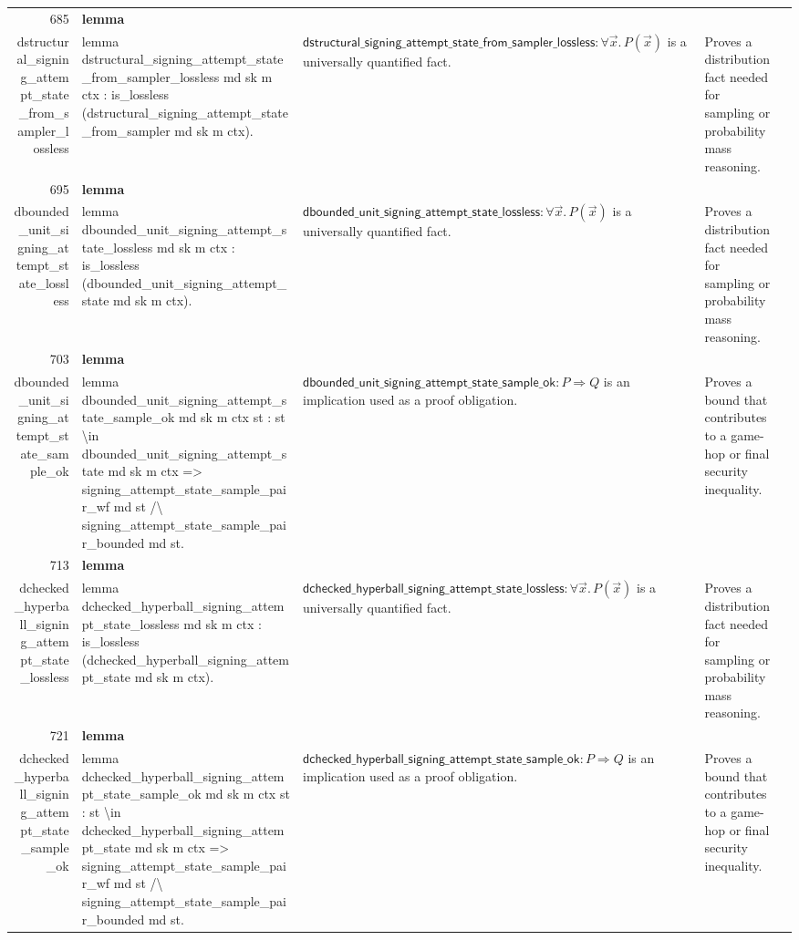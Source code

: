 \documentclass[10pt]{article}
\newcommand{\ec}[1]{\begingroup\ttfamily\scriptsize #1\endgroup}
\begin{document}
\begin{longtable}{r L{0.17\textwidth} L{0.26\textwidth} L{0.27\textwidth} L{0.20\textwidth}}
685 & \textbf{lemma}\\\ec{dstructural\_signing\_attempt\_state\_from\_sampler\_lossless} & \ec{lemma dstructural\_signing\_attempt\_state\_from\_sampler\_lossless md sk m ctx : is\_lossless (dstructural\_signing\_attempt\_state\_from\_sampler md sk m ctx).} & \(\mathsf{dstructural\_signing\_attempt\_state\_from\_sampler\_lossless} : \forall \vec{x}.\, P(\vec{x})\) is a universally quantified fact. & Proves a distribution fact needed for sampling or probability mass reasoning. \\
695 & \textbf{lemma}\\\ec{dbounded\_unit\_signing\_attempt\_state\_lossless} & \ec{lemma dbounded\_unit\_signing\_attempt\_state\_lossless md sk m ctx : is\_lossless (dbounded\_unit\_signing\_attempt\_state md sk m ctx).} & \(\mathsf{dbounded\_unit\_signing\_attempt\_state\_lossless} : \forall \vec{x}.\, P(\vec{x})\) is a universally quantified fact. & Proves a distribution fact needed for sampling or probability mass reasoning. \\
703 & \textbf{lemma}\\\ec{dbounded\_unit\_signing\_attempt\_state\_sample\_ok} & \ec{lemma dbounded\_unit\_signing\_attempt\_state\_sample\_ok md sk m ctx st : st \textbackslash{}in dbounded\_unit\_signing\_attempt\_state md sk m ctx => signing\_attempt\_state\_sample\_pair\_wf md st /\textbackslash{} signing\_attempt\_state\_sample\_pair\_bounded md st.} & \(\mathsf{dbounded\_unit\_signing\_attempt\_state\_sample\_ok} : P \Rightarrow Q\) is an implication used as a proof obligation. & Proves a bound that contributes to a game-hop or final security inequality. \\
713 & \textbf{lemma}\\\ec{dchecked\_hyperball\_signing\_attempt\_state\_lossless} & \ec{lemma dchecked\_hyperball\_signing\_attempt\_state\_lossless md sk m ctx : is\_lossless (dchecked\_hyperball\_signing\_attempt\_state md sk m ctx).} & \(\mathsf{dchecked\_hyperball\_signing\_attempt\_state\_lossless} : \forall \vec{x}.\, P(\vec{x})\) is a universally quantified fact. & Proves a distribution fact needed for sampling or probability mass reasoning. \\
721 & \textbf{lemma}\\\ec{dchecked\_hyperball\_signing\_attempt\_state\_sample\_ok} & \ec{lemma dchecked\_hyperball\_signing\_attempt\_state\_sample\_ok md sk m ctx st : st \textbackslash{}in dchecked\_hyperball\_signing\_attempt\_state md sk m ctx => signing\_attempt\_state\_sample\_pair\_wf md st /\textbackslash{} signing\_attempt\_state\_sample\_pair\_bounded md st.} & \(\mathsf{dchecked\_hyperball\_signing\_attempt\_state\_sample\_ok} : P \Rightarrow Q\) is an implication used as a proof obligation. & Proves a bound that contributes to a game-hop or final security inequality. \\

\end{longtable}
\end{document}
